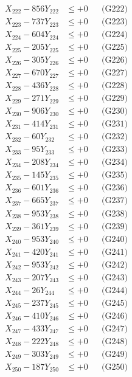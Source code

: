 \documentclass[a4paper,10pt]{article}
\begin{document}
{\begin{align}
X_{222} - 856Y_{222} &\leq +0 && \text{(G222)} \\
X_{223} - 737Y_{223} &\leq +0 && \text{(G223)} \\
X_{224} - 604Y_{224} &\leq +0 && \text{(G224)} \\
X_{225} - 205Y_{225} &\leq +0 && \text{(G225)} \\
X_{226} - 305Y_{226} &\leq +0 && \text{(G226)} \\
X_{227} - 670Y_{227} &\leq +0 && \text{(G227)} \\
X_{228} - 436Y_{228} &\leq +0 && \text{(G228)} \\
X_{229} - 271Y_{229} &\leq +0 && \text{(G229)} \\
X_{230} - 906Y_{230} &\leq +0 && \text{(G230)} \\
\allowbreak
X_{231} - 414Y_{231} &\leq +0 && \text{(G231)} \\
X_{232} - 60Y_{232} &\leq +0 && \text{(G232)} \\
X_{233} - 95Y_{233} &\leq +0 && \text{(G233)} \\
X_{234} - 208Y_{234} &\leq +0 && \text{(G234)} \\
X_{235} - 145Y_{235} &\leq +0 && \text{(G235)} \\
X_{236} - 601Y_{236} &\leq +0 && \text{(G236)} \\
X_{237} - 665Y_{237} &\leq +0 && \text{(G237)} \\
X_{238} - 953Y_{238} &\leq +0 && \text{(G238)} \\
X_{239} - 361Y_{239} &\leq +0 && \text{(G239)} \\
X_{240} - 953Y_{240} &\leq +0 && \text{(G240)} \\
\allowbreak
X_{241} - 420Y_{241} &\leq +0 && \text{(G241)} \\
X_{242} - 953Y_{242} &\leq +0 && \text{(G242)} \\
X_{243} - 207Y_{243} &\leq +0 && \text{(G243)} \\
X_{244} - 26Y_{244} &\leq +0 && \text{(G244)} \\
X_{245} - 237Y_{245} &\leq +0 && \text{(G245)} \\
X_{246} - 410Y_{246} &\leq +0 && \text{(G246)} \\
X_{247} - 433Y_{247} &\leq +0 && \text{(G247)} \\
X_{248} - 222Y_{248} &\leq +0 && \text{(G248)} \\
X_{249} - 303Y_{249} &\leq +0 && \text{(G249)} \\
X_{250} - 187Y_{250} &\leq +0 && \text{(G250)} \\

\end{align}}
\end{document}
